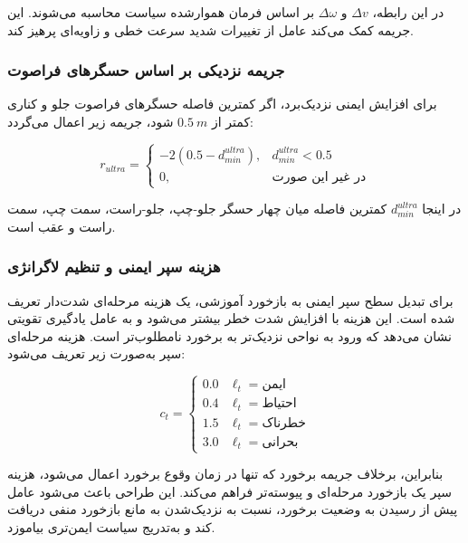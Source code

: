 در این رابطه، \(\Delta v\) و \(\Delta\omega\) بر اساس فرمان هموارشده سیاست محاسبه می‌شوند. این جریمه کمک می‌کند عامل از تغییرات شدید سرعت خطی و زاویه‌ای پرهیز کند.

\subsubsection{جریمه نزدیکی بر اساس حسگرهای فراصوت}
\label{subsubsec:ultrasonic_reward_final}

برای افزایش ایمنی نزدیک‌برد، اگر کمترین فاصله حسگرهای فراصوت جلو و کناری کمتر از \(0.5~m\) شود، جریمه زیر اعمال می‌گردد:

\begin{equation}
	r_{ultra}=
	\begin{cases}
		-2(0.5-d_{min}^{ultra}), & d_{min}^{ultra}<0.5\\
		0, & \text{در غیر این صورت}
	\end{cases}
	\label{eq:ultra_reward_final}
\end{equation}

در اینجا \(d_{min}^{ultra}\) کمترین فاصله میان چهار حسگر جلو-چپ، جلو-راست، سمت چپ، سمت راست و عقب است.
\subsubsection{هزینه سپر ایمنی و تنظیم لاگرانژی}
\label{subsubsec:shield_lagrangian_reward_final}

برای تبدیل سطح سپر ایمنی به بازخورد آموزشی، یک هزینه مرحله‌ای شدت‌دار تعریف شده است. این هزینه با افزایش شدت خطر بیشتر می‌شود و به عامل یادگیری تقویتی نشان می‌دهد که ورود به نواحی نزدیک‌تر به برخورد نامطلوب‌تر است. هزینه مرحله‌ای سپر به‌صورت زیر تعریف می‌شود:

\begin{equation}
	c_t =
	\begin{cases}
		0.0 & \ell_t=\text{ایمن}\\
		0.4 & \ell_t=\text{احتیاط}\\
		1.5 & \ell_t=\text{خطرناک}\\
		3.0 & \ell_t=\text{بحرانی}
	\end{cases}
	\label{eq:shield_step_cost_final}
\end{equation}

بنابراین، برخلاف جریمه برخورد که تنها در زمان وقوع برخورد اعمال می‌شود، هزینه سپر یک بازخورد مرحله‌ای و پیوسته‌تر فراهم می‌کند. این طراحی باعث می‌شود عامل پیش از رسیدن به وضعیت برخورد، نسبت به نزدیک‌شدن به مانع بازخورد منفی دریافت کند و به‌تدریج سیاست ایمن‌تری بیاموزد.

